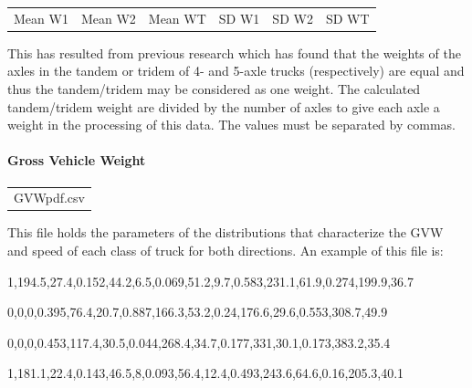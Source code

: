 \documentclass[
]{article}
\begin{document}
\begin{longtable}[]{@{}
  >{\raggedright\arraybackslash}p{}
  >{\raggedright\arraybackslash}p{}
  >{\raggedright\arraybackslash}p{}
  >{\raggedright\arraybackslash}p{}
  >{\raggedright\arraybackslash}p{}
  >{\raggedright\arraybackslash}p{}@{}}
\toprule\noalign{}
\endhead
\bottomrule\noalign{}
\endlastfoot
Mean W1 & Mean W2 & Mean WT & SD W1 & SD W2 & SD WT \\
\end{longtable}

This has resulted from previous research which has found that the
weights of the axles in the tandem or tridem of 4- and 5-axle trucks
(respectively) are equal and thus the tandem/tridem may be considered as
one weight. The calculated tandem/tridem weight are divided by the
number of axles to give each axle a weight in the processing of this
data. The values must be separated by commas.

\paragraph*{\texorpdfstring{\hfill\break
Gross Vehicle
Weight}{ Gross Vehicle Weight}}\label{gross-vehicle-weight}

\begin{longtable}[]{@{}
  >{\centering\arraybackslash}p{}@{}}
\toprule\noalign{}
\endhead
\bottomrule\noalign{}
\endlastfoot
GVWpdf.csv \\
\end{longtable}

This file holds the parameters of the distributions that characterize
the GVW and speed of each class of truck for both directions. An example
of this file is:

1,194.5,27.4,0.152,44.2,6.5,0.069,51.2,9.7,0.583,231.1,61.9,0.274,199.9,36.7

0,0,0,0.395,76.4,20.7,0.887,166.3,53.2,0.24,176.6,29.6,0.553,308.7,49.9

0,0,0,0.453,117.4,30.5,0.044,268.4,34.7,0.177,331,30.1,0.173,383.2,35.4

1,181.1,22.4,0.143,46.5,8,0.093,56.4,12.4,0.493,243.6,64.6,0.16,205.3,40.1
\end{document}
